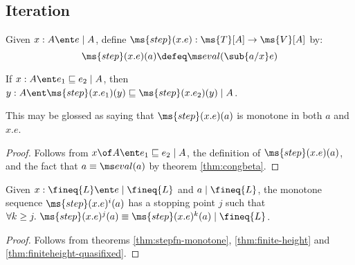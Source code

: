 \documentclass{article}
\newcommand{\ale}{\sqsubseteq}
\newcommand{\lr}[2]{#2\mathrel{|}#1}
\newcommand{\lrcx}[3]{#1 \ent \lr{#2}{#3}}
\newcommand{\lrof}[1]{\ms{T}[#1]}
\newcommand{\Val}[1]{\ms{V}[#1]}
\begin{document}

\subsection{Iteration}

\newcommand{\stepfn}{\ms{step}}

\begin{definition}
  Given $\lrcx{x:A}{A}{e}$, define $\stepfn(x.e) : \lrof{A} \to \Val{A}$
  by: \[\stepfn(x.e)(a) \defeq \evalfn(\sub{a/x} e)\]
\end{definition}

\begin{theorem}\label{thm:stepfn-monotone}
  If $\lrcx{x:A}{A}{e_1 \ale e_2}$, then $\lrcx{y:A}{A}{\stepfn(x.e_1)(y) \ale
    \stepfn(x.e_2)(y)}$.
\end{theorem}
This may be glossed as saying that $\stepfn(x.e)(a)$ is monotone in both $a$ and
$x.e$.

\begin{proof}
  Follows from $\lrcx{x\of A}{A}{e_1 \ale e_2}$, the definition of
  $\stepfn(x.e)(a)$, and the fact that $a \equiv \evalfn(a)$ by theorem
  \ref{thm:congbeta}.
\end{proof}

\begin{corollary}\label{cor:fineq-stops}
  Given $\lrcx{x:\fineq{L}}{\fineq{L}}{e}$ and $\lr{\fineq{L}}{a}$, the monotone
  sequence $\stepfn(x.e)^i(a)$ has a stopping point $j$ such that $\forall k \ge
  j.\ \lr{\fineq{L}}{\stepfn(x.e)^j(a) \equiv \stepfn(x.e)^{k}(a)}$.
\end{corollary}
\begin{proof}
  Follows from theorems \ref{thm:stepfn-monotone}, \ref{thm:finite-height} and
  \ref{thm:finiteheight-quasifixed}.
\end{proof}
\end{document}
